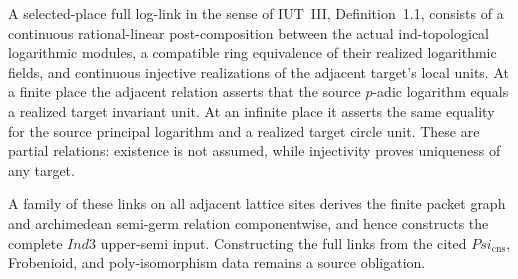 \begin{definition}
  \label{def:source-full-vertical-log-links}
  \leanok
  A selected-place full log-link in the sense of IUT~III,
  Definition~1.1, consists of a continuous rational-linear post-composition
  between the actual ind-topological logarithmic modules, a compatible ring
  equivalence of their realized logarithmic fields, and continuous injective
  realizations of the adjacent target's local units.  At a finite place the
  adjacent relation asserts that the source \(p\)-adic logarithm equals a
  realized target invariant unit.  At an infinite place it asserts the same
  equality for the source principal logarithm and a realized target circle
  unit.  These are partial relations: existence is not assumed, while
  injectivity proves uniqueness of any target.

  A family of these links on all adjacent lattice sites derives the finite
  packet graph and archimedean semi-germ relation componentwise, and hence
  constructs the complete \(Ind{3}\) upper-semi input.  Constructing the
  full links from the cited \(Psi_{\mathrm{cns}}\), Frobenioid, and
  poly-isomorphism data remains a source obligation.
\end{definition}

